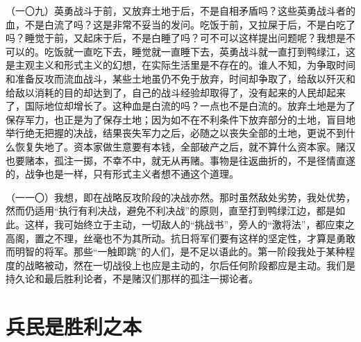 （一〇九）英勇战斗于前，又放弃土地于后，不是自相矛盾吗？这些英勇战斗者的血，不是白流了吗？这是非常不妥当的发问。吃饭于前，又拉屎于后，不是白吃了吗？睡觉于前，又起床于后，不是白睡了吗？可不可以这样提出问题呢？我想是不可以的。吃饭就一直吃下去，睡觉就一直睡下去，英勇战斗就一直打到鸭绿江，这是主观主义和形式主义的幻想，在实际生活里是不存在的。谁人不知，为争取时间和准备反攻而流血战斗，某些土地虽仍不免于放弃，时间却争取了，给敌以歼灭和给敌以消耗的目的却达到了，自己的战斗经验却取得了，没有起来的人民却起来了，国际地位却增长了。这种血是白流的吗？一点也不是白流的。放弃土地是为了保存军力，也正是为了保存土地；因为如不在不利条件下放弃部分的土地，盲目地举行绝无把握的决战，结果丧失军力之后，必随之以丧失全部的土地，更说不到什么恢复失地了。资本家做生意要有本钱，全部破产之后，就不算什么资本家。赌汉也要赌本，孤注一掷，不幸不中，就无从再赌。事物是往返曲折的，不是径情直遂的，战争也是一样，只有形式主义者想不通这个道理。

（一一〇）我想，即在战略反攻阶段的决战亦然。那时虽然敌处劣势，我处优势，然而仍适用“执行有利决战，避免不利决战”的原则，直至打到鸭绿江边，都是如此。这样，我可始终立于主动，一切敌人的“挑战书”，旁人的“激将法”，都应束之高阁，置之不理，丝毫也不为其所动。抗日将军们要有这样的坚定性，才算是勇敢而明智的将军。那些“一触即跳”的人们，是不足以语此的。第一阶段我处于某种程度的战略被动，然在一切战役上也应是主动的，尔后任何阶段都应是主动。我们是持久论和最后胜利论者，不是赌汉们那样的孤注一掷论者。

\section{兵民是胜利之本}

